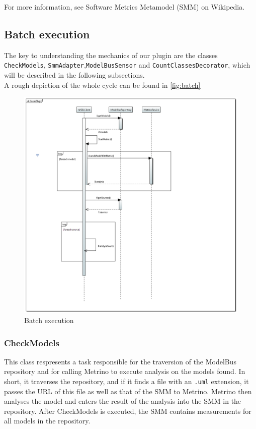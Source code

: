 For more information, see Software Metrics Metamodel (SMM) on Wikipedia.


\subsection{Batch execution}

The key to understanding the mechanics of our plugin are the classes
\texttt{CheckModels}, \texttt{SmmAdapter},\texttt{ModelBusSensor} and
\texttt{CountClassesDecorator}, which will be described in the
following subsections.\\
A rough depiction of the whole cycle can be found in \autoref{fig:batch}

\begin{figure}
	\centering
		\includegraphics[width=\textwidth]{sequencediagramm.PNG}
	\caption{Batch execution}
	\label{fig:batch}
  
\end{figure}



\subsubsection{CheckModels}

This class respresents a task responsible for the traversion of the
ModelBus repository and for calling Metrino to execute analysis on the
models found.  In short, it traverses the repository, and if it finds
a file with an \texttt{.uml} extension, it passes the URL of this file
as well as that of the SMM to Metrino. Metrino then analyses the model
and enters the result of the analysis into the SMM in the repository.
After CheckModels is executed, the SMM contains measurements for
all models in the repository.

